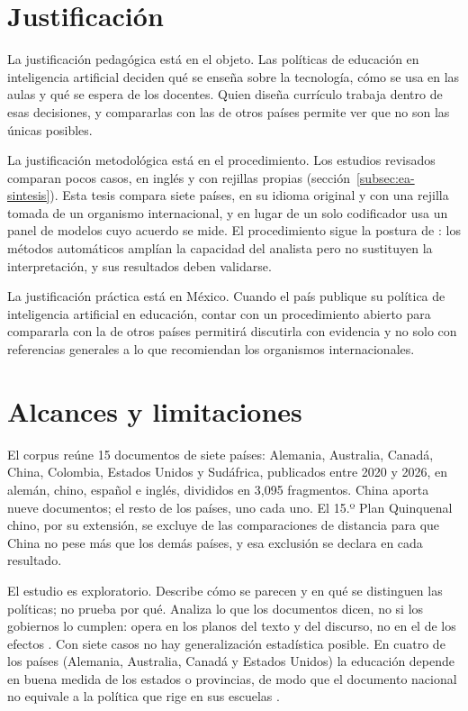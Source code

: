 \section{Justificación}
\label{sec:justificacion}

La justificación pedagógica está en el objeto. Las políticas de educación en inteligencia
artificial deciden qué se enseña sobre la tecnología, cómo se usa en las aulas y qué se
espera de los docentes. Quien diseña currículo trabaja dentro de esas decisiones, y
compararlas con las de otros países permite ver que no son las únicas posibles.

La justificación metodológica está en el procedimiento. Los estudios revisados comparan
pocos casos, en inglés y con rejillas propias (sección~\ref{subsec:ea-sintesis}). Esta tesis
compara siete países, en su idioma original y con una rejilla tomada de un organismo
internacional, y en lugar de un solo codificador usa un panel de modelos cuyo acuerdo se
mide. El procedimiento sigue la postura de \citet{grimmer2013text}: los métodos automáticos
amplían la capacidad del analista pero no sustituyen la interpretación, y sus resultados
deben validarse.

La justificación práctica está en México. Cuando el país publique su política de
inteligencia artificial en educación, contar con un procedimiento abierto para compararla
con la de otros países permitirá discutirla con evidencia y no solo con referencias
generales a lo que recomiendan los organismos internacionales.

\section{Alcances y limitaciones}
\label{sec:alcances}

El corpus reúne 15 documentos de siete países: Alemania, Australia, Canadá, China,
Colombia, Estados Unidos y Sudáfrica, publicados entre 2020 y 2026, en alemán, chino,
español e inglés, divididos en 3{,}095 fragmentos. China aporta nueve documentos; el resto de
los países, uno cada uno. El 15.º Plan Quinquenal chino, por su extensión, se excluye de las
comparaciones de distancia para que China no pese más que los demás países, y esa exclusión
se declara en cada resultado.

El estudio es exploratorio. Describe cómo se parecen y en qué se distinguen las políticas; no
prueba por qué. Analiza lo que los documentos dicen, no si los gobiernos lo cumplen: opera en
los planos del texto y del discurso, no en el de los efectos \citep{rizvi2010globalizing}.
Con siete casos no hay generalización estadística posible. En cuatro de los países
(Alemania, Australia, Canadá y Estados Unidos) la educación depende en buena medida de los
estados o provincias, de modo que el documento nacional no equivale a la política que rige
en sus escuelas \citep{bray1995levels}.

